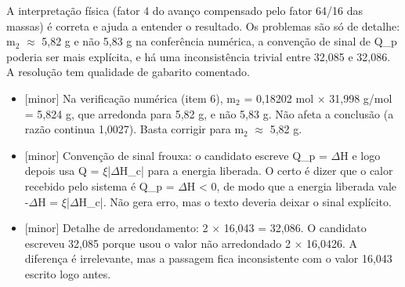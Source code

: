 \documentclass{article}%
\begin{document}
A interpretação física (fator 4 do avanço compensado pelo fator 64/16 das massas) é correta e ajuda a entender o resultado.\newline%
\newline%
Os problemas são só de detalhe: m$_{2}$ $\approx$ 5,82 g e não 5,83 g na conferência numérica, a convenção de sinal de Q\_p poderia ser mais explícita, e há uma inconsistência trivial entre 32,085 e 32,086. A resolução tem qualidade de gabarito comentado.%
\begin{itemize}%
\item%
{[}minor{]} Na verificação numérica (item 6), m$_{2}$ = 0,18202 mol $\times$ 31,998 g/mol = 5,824 g, que arredonda para 5,82 g, e não 5,83 g. Não afeta a conclusão (a razão continua 1,0027). Basta corrigir para m$_{2}$ $\approx$ 5,82 g.%
\item%
{[}minor{]} Convenção de sinal frouxa: o candidato escreve Q\_p = $\Delta$H e logo depois usa Q = $\xi$|$\Delta$H\_c| para a energia liberada. O certo é dizer que o calor recebido pelo sistema é Q\_p = $\Delta$H < 0, de modo que a energia liberada vale -$\Delta$H = $\xi$|$\Delta$H\_c|. Não gera erro, mas o texto deveria deixar o sinal explícito.%
\item%
{[}minor{]} Detalhe de arredondamento: 2 $\times$ 16,043 = 32,086. O candidato escreveu 32,085 porque usou o valor não arredondado 2 $\times$ 16,0426. A diferença é irrelevante, mas a passagem fica inconsistente com o valor 16,043 escrito logo antes.%
\end{itemize}%
\end{document}
